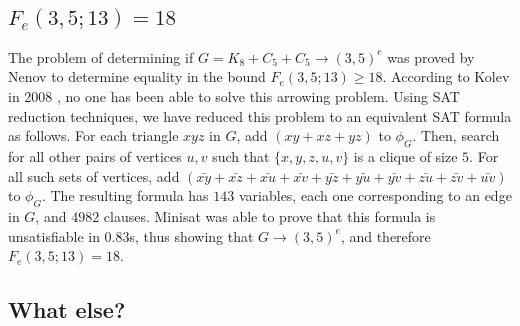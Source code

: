 \documentclass[paper=a4, fontsize=11pt]{scrartcl} %
\begin{document}
\label{sec:arrowComputations}
\subsection{$F_e(3,5;13) = 18$}
The problem of determining if $G = K_8 + C_5 + C_5 \to (3,5)^e$ was proved by Nenov \cite{Nenov83-1}
to determine equality in the bound $F_e(3,5;13) \geq 18$. According to Kolev in 2008 \cite{Kolev08-2},
no one has been able to solve this arrowing problem. Using SAT reduction techniques, we have 
reduced this problem to an equivalent SAT formula as follows. For each triangle $xyz$ in $G$, add
$(xy + xz + yz)$ to $\phi_G$. Then, search for all other pairs of vertices $u,v$ such that $\{x,y,z,u,v\}$ is a clique
of size $5$. For all such sets of vertices, add $(\bar{xy} + \bar{xz} + \bar{xu} + \bar{xv} + \bar{yz} + \bar{yu} + \bar{yv} + \bar{zu} + \bar{zv} + \bar{uv})$
to $\phi_G$. The resulting formula has $143$ variables, each one corresponding to an edge in $G$,
and $4982$ clauses. Minisat was able to prove that this formula is unsatisfiable in 0.83s, thus
showing that $G \to (3,5)^e$, and therefore $F_e(3,5;13) = 18$.

\subsection{What else?}
\end{document}
